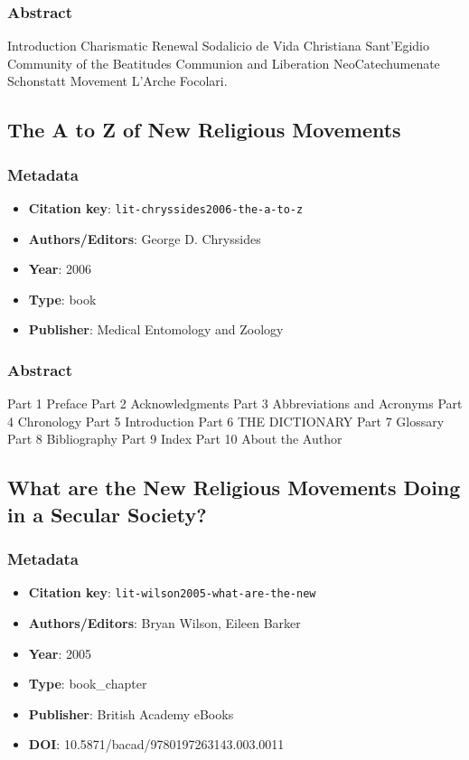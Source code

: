 \subsubsection*{Abstract}
Introduction Charismatic Renewal Sodalicio de Vida Christiana Sant'Egidio Community of the Beatitudes Communion and Liberation NeoCatechumenate Schonstatt Movement L'Arche Focolari.

\subsection{The A to Z of New Religious Movements}\label{lit:lit-chryssides2006-the-a-to-z}
\subsubsection*{Metadata}
\begin{itemize}
  \item \textbf{Citation key}: \texttt{lit-chryssides2006-the-a-to-z}
  \item \textbf{Authors/Editors}: George D. Chryssides
  \item \textbf{Year}: 2006
  \item \textbf{Type}: book
  \item \textbf{Publisher}: Medical Entomology and Zoology
\end{itemize}
\subsubsection*{Abstract}
Part 1 Preface Part 2 Acknowledgments Part 3 Abbreviations and Acronyms Part 4 Chronology Part 5 Introduction Part 6 THE DICTIONARY Part 7 Glossary Part 8 Bibliography Part 9 Index Part 10 About the Author

\subsection{What are the New Religious Movements Doing in a Secular Society?}\label{lit:lit-wilson2005-what-are-the-new}
\subsubsection*{Metadata}
\begin{itemize}
  \item \textbf{Citation key}: \texttt{lit-wilson2005-what-are-the-new}
  \item \textbf{Authors/Editors}: Bryan Wilson, Eileen Barker
  \item \textbf{Year}: 2005
  \item \textbf{Type}: book\_chapter
  \item \textbf{Publisher}: British Academy eBooks
  \item \textbf{DOI}: 10.5871/bacad/9780197263143.003.0011
\end{itemize}
